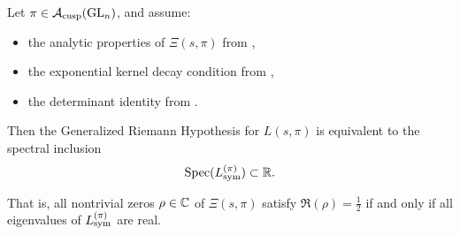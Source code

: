 \begin{theorem}
\label{thm:spec_real_equiv_grh}
Let \( \pi \in \mathcal{A}_{\mathrm{cusp}}(\mathrm{GL}_n) \), and assume:
\begin{itemize}
  \item the analytic properties of \( \Xi(s, \pi) \) from ,
  \item the exponential kernel decay condition from ,
  \item the determinant identity from .
\end{itemize}

Then the Generalized Riemann Hypothesis for \( L(s, \pi) \) is equivalent to the spectral inclusion
\[
\operatorname{Spec}(L_{\mathrm{sym}}^{(\pi)}) \subset \mathbb{R}.
\]

That is, all nontrivial zeros \( \rho \in \mathbb{C} \) of \( \Xi(s, \pi) \) satisfy \( \Re(\rho) = \tfrac{1}{2} \) if and only if all eigenvalues of \( L_{\mathrm{sym}}^{(\pi)} \) are real.
\end{theorem}
